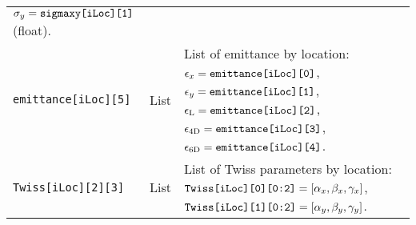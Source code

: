 \begin{sidewaystable}[h]
\begin{center}
\begin{tabular}{|l|c|p{12cm}|}
                                                  $\sigma_y={\rm \texttt{sigmaxy[iLoc][1]}}$ (float).                  \\
      \texttt{emittance[iLoc][5]} & List        & List of emittance by location:
                                                  $\epsilon_x      ={\rm \texttt{emittance[iLoc][0]}}$, 
                                                  $\epsilon_y      ={\rm \texttt{emittance[iLoc][1]}}$, 
                                                  $\epsilon_{\rm L} ={\rm \texttt{emittance[iLoc][2]}}$, 
                                                  $\epsilon_{\rm 4D}={\rm \texttt{emittance[iLoc][3]}}$, 
                                                  $\epsilon_{\rm 6D}={\rm \texttt{emittance[iLoc][4]}}$.                \\
      \texttt{Twiss[iLoc][2][3]}  & List        & List of Twiss parameters by location:
                                                  ${\rm \texttt{Twiss[iLoc][0][0:2]}}=[\alpha_x, \beta_x, \gamma_x]$, 
                                                  ${\rm \texttt{Twiss[iLoc][1][0:2]}}=[\alpha_y, \beta_y, \gamma_y]$.  \\
       \hline
    \end{tabular}
  \end{center}
\end{sidewaystable}
